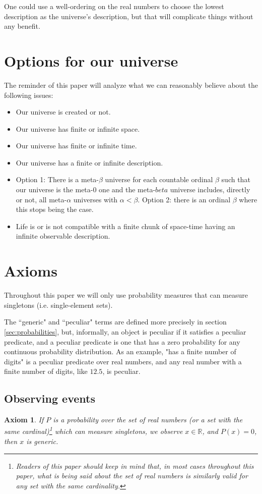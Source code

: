 \documentclass[a4paper
,draft
]{article}
\def\reale{\mathbb{R}}
\newcommand{\ghilimele}[1]{``#1"}
\newtheorem{axiom}{Axiom}
\begin{document}
One could use a well-ordering on the real numbers to choose the
lowest description as the universe's description, but that will
complicate things without any benefit.

\section{Options for our universe}

The reminder of this paper will analyze what we can reasonably believe about
the following issues:
\begin{itemize}
  \item Our universe is created or not.
  \item Our universe has finite or infinite space.
  \item Our universe has finite or infinite time.
  \item Our universe has a finite or infinite description.
  \item Option 1: There is a meta-$\beta$ universe for each countable ordinal
        $\beta$ such that our universe is the meta-$0$ one and the meta-$beta$
        universe includes, directly or not, all meta-$\alpha$ universes with
        $\alpha < \beta$. Option 2: there is an ordinal $\beta$ where this
        stops being the case.
  \item Life is or is not compatible with a finite chunk of space-time having
        an infinite observable description.
\end{itemize}

\section{Axioms}
\label{sec:axioms}

Throughout this paper we will only use probability measures that can measure
singletons (i.e. single-element sets).

The \ghilimele{generic} and \ghilimele{peculiar} terms are defined more
precisely in section \ref{sec:probabilities}, but, informally,
an object is peculiar if it satisfies a peculiar predicate, and a peculiar
predicate is one that has a zero probability for any continuous probability
distribution. As an example, "has a finite number of digits" is a peculiar
predicate over real numbers, and any real number with a finite number
of digits, like $12.5$, is peculiar.

\subsection{Observing events}
\begin{axiom}
  If $P$ is a probability over the set of real numbers
  (or a set with the same cardinal)\footnote{Readers of this paper should
  keep in mind that, in most cases throughout this paper, what is being said
  about the set of real numbers is similarly valid for any set with the same
  cardinality.}
  which can measure singletons,
  we observe $x\in\reale$, and $P(x)=0$, then $x$ is generic.
\end{axiom}
\end{document}
